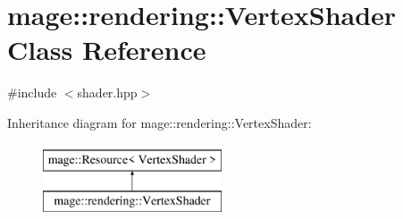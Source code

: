 \hypertarget{classmage_1_1rendering_1_1_vertex_shader}{}\section{mage\+:\+:rendering\+:\+:Vertex\+Shader Class Reference}
\label{classmage_1_1rendering_1_1_vertex_shader}


{\ttfamily \#include $<$shader.\+hpp$>$}

Inheritance diagram for mage\+:\+:rendering\+:\+:Vertex\+Shader\+:\begin{figure}[H]
\begin{center}
\leavevmode
\includegraphics[height=2.000000cm]{classmage_1_1rendering_1_1_vertex_shader}
\end{center}
\end{figure}
